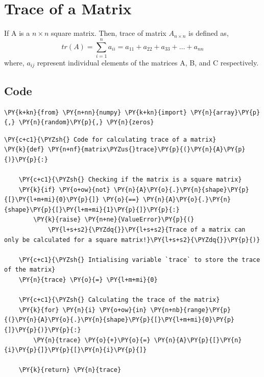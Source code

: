     
    
    

    
    \hypertarget{trace-of-a-matrix}{%
\section{Trace of a Matrix}\label{trace-of-a-matrix}}

    If A is a \(n \times n\) square matrix. Then, trace of matrix
\(A_{n \times n}\) is defined as,
\[tr(A) = \sum_{i=1}^n a_{ii} = a_{11} + a_{22} + a_{33} + \dots + a_{nn}\]
where, \(a_{ij}\) represent individual elements of the matrices A, B,
and C respectively.

    \hypertarget{code}{%
\subsection{Code}\label{code}}

    \begin{tcolorbox}[breakable, size=fbox, boxrule=1pt, pad at break*=1mm,colback=cellbackground, colframe=cellborder]
\begin{Verbatim}[commandchars=\\\{\}]
\PY{k+kn}{from} \PY{n+nn}{numpy} \PY{k+kn}{import} \PY{n}{array}\PY{p}{,} \PY{n}{random}\PY{p}{,} \PY{n}{zeros}
\end{Verbatim}
\end{tcolorbox}

    \begin{tcolorbox}[breakable, size=fbox, boxrule=1pt, pad at break*=1mm,colback=cellbackground, colframe=cellborder]
\begin{Verbatim}[commandchars=\\\{\}]
\PY{c+c1}{\PYZsh{} Code for calculating trace of a matrix}
\PY{k}{def} \PY{n+nf}{matrix\PYZus{}trace}\PY{p}{(}\PY{n}{A}\PY{p}{)}\PY{p}{:}

    \PY{c+c1}{\PYZsh{} Checking if the matrix is a square matrix}
    \PY{k}{if} \PY{o+ow}{not} \PY{n}{A}\PY{o}{.}\PY{n}{shape}\PY{p}{[}\PY{l+m+mi}{0}\PY{p}{]} \PY{o}{==} \PY{n}{A}\PY{o}{.}\PY{n}{shape}\PY{p}{[}\PY{l+m+mi}{1}\PY{p}{]}\PY{p}{:}
        \PY{k}{raise} \PY{n+ne}{ValueError}\PY{p}{(}
            \PY{l+s+s2}{\PYZdq{}}\PY{l+s+s2}{Trace of a matrix can only be calculated for a square matrix!}\PY{l+s+s2}{\PYZdq{}}\PY{p}{)}

    \PY{c+c1}{\PYZsh{} Intialising variable `trace` to store the trace of the matrix}
    \PY{n}{trace} \PY{o}{=} \PY{l+m+mi}{0}

    \PY{c+c1}{\PYZsh{} Calculating the trace of the matrix}
    \PY{k}{for} \PY{n}{i} \PY{o+ow}{in} \PY{n+nb}{range}\PY{p}{(}\PY{n}{A}\PY{o}{.}\PY{n}{shape}\PY{p}{[}\PY{l+m+mi}{0}\PY{p}{]}\PY{p}{)}\PY{p}{:}
        \PY{n}{trace} \PY{o}{+}\PY{o}{=} \PY{n}{A}\PY{p}{[}\PY{n}{i}\PY{p}{]}\PY{p}{[}\PY{n}{i}\PY{p}{]}

    \PY{k}{return} \PY{n}{trace}
\end{Verbatim}
\end{tcolorbox}

